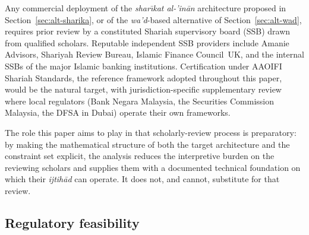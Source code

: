 \documentclass[preprint,12pt,authoryear]{elsarticle}
\theoremstyle{definition}
\begin{document}
Any commercial deployment of the \emph{shar\={\i}kat
al-'in\={a}n} architecture proposed in
Section~\ref{sec:alt-sharika}, or of the \emph{wa'd}-based
alternative of Section~\ref{sec:alt-wad}, requires prior review
by a constituted Shariah supervisory board (SSB) drawn from
qualified scholars. Reputable independent SSB providers include
Amanie Advisors, Shariyah Review Bureau, Islamic Finance
Council~UK, and the internal SSBs of the major Islamic banking
institutions. Certification under AAOIFI Shariah Standards,
the reference framework adopted throughout this paper, would
be the natural target, with jurisdiction-specific supplementary
review where local regulators (Bank Negara Malaysia, the
Securities Commission Malaysia, the DFSA in Dubai) operate their
own frameworks.

The role this paper aims to play in that scholarly-review process
is preparatory: by making the mathematical structure of both the
target architecture and the constraint set explicit, the analysis
reduces the interpretive burden on the reviewing scholars and
supplies them with a documented technical foundation on which
their \emph{ijtih\={a}d} can operate. It does not, and cannot,
substitute for that review.

\subsection{Regulatory feasibility}
\label{sec:disc-regulatory}
\end{document}
